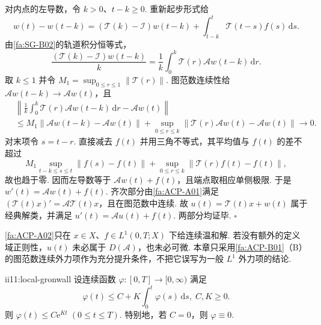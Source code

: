 \begin{FAProof}
对内点的左导数，令 \(\displaystyle k>0\)、\(\displaystyle t-k\geqslant0\). 重新起步形式给
\[
w(t)-w(t-k)
=
(\mathcal T(k)-\mathcal I)w(t-k)
+
\int_{t-k}^t\mathcal T(t-s)f(s)\,\mathrm{d}s.
\]
由\autoref{fa:SG-B02}的轨道积分恒等式，
\[
\frac{(\mathcal T(k)-\mathcal I)w(t-k)}k
=
\frac1k\int_0^k\mathcal T(r)\mathcal Aw(t-k)\,\mathrm{d}r.
\]
取 \(\displaystyle k\leqslant1\) 并令 \(\displaystyle M_1=\sup_{0\leqslant r\leqslant1}\|\mathcal T(r)\|\). 图范数连续性给 \(\displaystyle\mathcal Aw(t-k)\to\mathcal Aw(t)\)，且
\[
\begin{aligned}
&\displaystyle \left\|
\frac1k\int_0^k\mathcal T(r)\mathcal Aw(t-k)\,\mathrm{d}r
-\mathcal Aw(t)
\right\|\\[6pt]
&\leqslant
M_1\|\mathcal Aw(t-k)-\mathcal Aw(t)\|
+
\sup_{0\leqslant r\leqslant k}
\|\mathcal T(r)\mathcal Aw(t)-\mathcal Aw(t)\|
\longrightarrow0.
\end{aligned}
\]
对末项令 \(\displaystyle s=t-r\). 直接减去 \(\displaystyle f(t)\) 并用三角不等式，其平均值与 \(\displaystyle f(t)\) 的差不超过
\[
M_1\sup_{t-k\leqslant s\leqslant t}\|f(s)-f(t)\|
+
\sup_{0\leqslant r\leqslant k}\|\mathcal T(r)f(t)-f(t)\|,
\]
故也趋于零. 因而左导数等于 \(\displaystyle\mathcal Aw(t)+f(t)\)，且端点取相应单侧极限. 于是 \(\displaystyle w'(t)=\mathcal Aw(t)+f(t).\)
齐次部分由\autoref{fa:ACP-A01}满足 \(\displaystyle(\mathcal T(t)x)'=\mathcal A\mathcal T(t)x\)，且在图范数中连续. 故 \(\displaystyle u(t)=\mathcal T(t)x+w(t)\) 属于经典解类，并满足 \(\displaystyle u'(t)=\mathcal Au(t)+f(t)\). 两部分均证毕.
\hfill\(\square\)
\end{FAProof}

\begin{FAWarning}[经典/温和正则性边界]
\autoref{fa:ACP-A02}只在 \(\displaystyle x\in X\)、\(\displaystyle f\in L^1(0,T;X)\) 下给连续温和解. 若没有额外的定义域正则性，\(\displaystyle u(t)\) 未必属于 \(\displaystyle D(\mathcal A)\)，也未必可微. 本章只采用\autoref{fa:ACP-B01}（B）的图范数连续外力项作为充分提升条件，不把它误写为一般 \(\displaystyle L^1\) 外力项的结论.
\end{FAWarning}

\begin{FALemma}[C][局部 Gronwall 引理]{ii11:local-gronwall}
设连续函数 \(\displaystyle\varphi:[0,T]\to[0,\infty)\) 满足
\[
\varphi(t)
\leqslant
C+K\int_0^t\varphi(s)\,\mathrm{d}s,
\;
C,K\geqslant0.
\]
则 \(\displaystyle \varphi(t) \leqslant C\mathrm{e}^{Kt} \; (0\leqslant t\leqslant T).\)
特别地，若 \(\displaystyle C=0\)，则 \(\displaystyle\varphi\equiv0\).
\end{FALemma}

